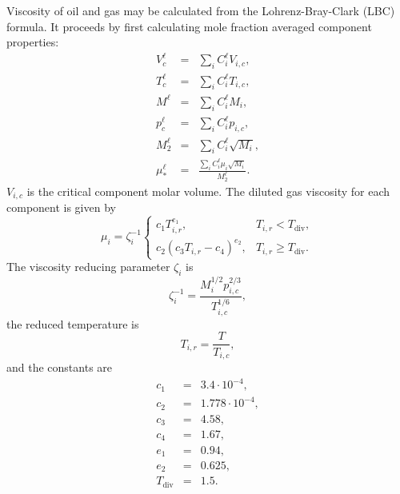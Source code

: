 Viscosity of oil and gas may be calculated from the Lohrenz-Bray-Clark
(LBC) formula. It proceeds by first calculating mole fraction averaged
component properties:
\begin{eqnarray}
  V_c^\ell & = & \sum_i C_i^\ell V_{i,c}, \\
  T_c^\ell & = & \sum_i C_i^\ell T_{i,c}, \\
  M^\ell & = & \sum_i C_i^\ell M_i, \\
  p_c^\ell & = & \sum_i C_i^\ell p_{i,c}, \\
  M_2^\ell & = & \sum_i C_i^\ell \sqrt{M_i}, \\
  \mu_*^\ell & = & \frac{\sum_i C_i^\ell \mu_i \sqrt{M_i}}{M_2^\ell}.
\end{eqnarray}
$V_{i,c}$ is the critical component molar volume. The diluted gas
viscosity for each component is given by
\begin{equation}
  \mu_i = \zeta_i^{-1} \left\{
    \begin{array}{ll}
      c_1 T_{i,r}^{e_1}, & T_{i,r} < T_\text{div}, \\
      c_2 \left( c_3 T_{i,r} - c_4 \right)^{e_2}, &
      T_{i,r} \geq T_\text{div}.
    \end{array}
  \right.
\end{equation}
The viscosity reducing parameter $\zeta_i$ is
\begin{equation}
  \zeta_i^{-1} = \frac{M_i^{1/2} p_{i,c}^{2/3}}{T_{i,c}^{1/6}},
\end{equation}
the reduced temperature is
\begin{equation}
  T_{i,r} = \frac{T}{T_{i,c}},
\end{equation}
and the constants are
\begin{eqnarray}
  c_1 & = & 3.4\cdot 10^{-4}, \\
  c_2 & = & 1.778\cdot 10^{-4}, \\
  c_3 & = & 4.58, \\
  c_4 & = & 1.67, \\
  e_1 & = & 0.94, \\
  e_2 & = & 0.625, \\
  T_\text{div} & = & 1.5.
\end{eqnarray}

